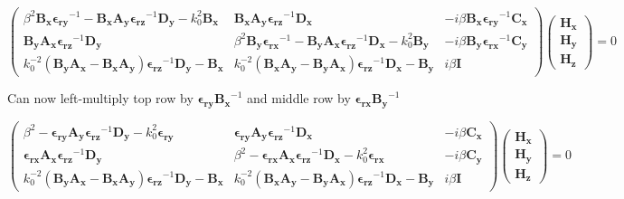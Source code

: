 \documentclass[]{article}
\begin{document}
\begin{equation*}
\begin{pmatrix}
\beta^2 \mathbf{B_x} \mathbf{\epsilon_{ry}}^{-1} - \mathbf{B_x} \mathbf{A_y} \mathbf{\epsilon_{rz}}^{-1} \mathbf{D_y} - k_0^2 \mathbf{B_x} 
&
\mathbf{B_x} \mathbf{A_y} \mathbf{\epsilon_{rz}}^{-1} \mathbf{D_x}
&
-i \beta \mathbf{B_x} \mathbf{\epsilon_{ry}}^{-1} \mathbf{C_x}
\\
\mathbf{B_y} \mathbf{A_x} \mathbf{\epsilon_{rz}}^{-1} \mathbf{D_y} 
& 
\beta^2 \mathbf{B_y} \mathbf{\epsilon_{rx}}^{-1} - \mathbf{B_y} \mathbf{A_x} \mathbf{\epsilon_{rz}}^{-1} \mathbf{D_x} - k_0^2 \mathbf{B_y}
&
-i \beta \mathbf{B_y} \mathbf{\epsilon_{rx}}^{-1} \mathbf{C_y}
\\
k_0^{-2} (\mathbf{B_y} \mathbf{A_x} - \mathbf{B_x} \mathbf{A_y}) \mathbf{\epsilon_{rz}}^{-1} \mathbf{D_y} - \mathbf{B_x}
&
k_0^{-2} (\mathbf{B_x} \mathbf{A_y} - \mathbf{B_y} \mathbf{A_x}) \mathbf{\epsilon_{rz}}^{-1} \mathbf{D_x} - \mathbf{B_y}
&
i \beta \mathbf{I}
\end{pmatrix}
\begin{pmatrix}
\mathbf{H_x} \\
\mathbf{H_y} \\
\mathbf{H_z}
\end{pmatrix}
=0
\end{equation*}

Can now left-multiply top row by $\mathbf{\epsilon_{ry}} \mathbf{B_x}^{-1}$ and middle row by $\mathbf{\epsilon_{rx}} \mathbf{B_y}^{-1}$

\begin{equation*}
\begin{pmatrix}
\beta^2 - \mathbf{\epsilon_{ry}} \mathbf{A_y} \mathbf{\epsilon_{rz}}^{-1} \mathbf{D_y} - k_0^2 \mathbf{\epsilon_{ry}}
&
\mathbf{\epsilon_{ry}} \mathbf{A_y} \mathbf{\epsilon_{rz}}^{-1} \mathbf{D_x}
&
-i \beta \mathbf{C_x}
\\
\mathbf{\epsilon_{rx}}  \mathbf{A_x} \mathbf{\epsilon_{rz}}^{-1} \mathbf{D_y} 
& 
\beta^2 - \mathbf{\epsilon_{rx}} \mathbf{A_x} \mathbf{\epsilon_{rz}}^{-1} \mathbf{D_x} - k_0^2 \mathbf{\epsilon_{rx}}
&
-i \beta \mathbf{C_y}
\\
k_0^{-2} (\mathbf{B_y} \mathbf{A_x} - \mathbf{B_x} \mathbf{A_y}) \mathbf{\epsilon_{rz}}^{-1} \mathbf{D_y} - \mathbf{B_x}
&
k_0^{-2} (\mathbf{B_x} \mathbf{A_y} - \mathbf{B_y} \mathbf{A_x}) \mathbf{\epsilon_{rz}}^{-1} \mathbf{D_x} - \mathbf{B_y}
&
i \beta \mathbf{I}
\end{pmatrix}
\begin{pmatrix}
\mathbf{H_x} \\
\mathbf{H_y} \\
\mathbf{H_z}
\end{pmatrix}
=0
\end{equation*}
\end{document}
